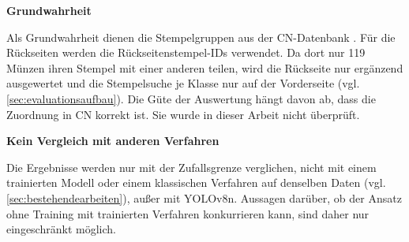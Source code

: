 \vspace{\baselineskip}

\noindent \textbf{Grundwahrheit} 

\noindent Als Grundwahrheit dienen die Stempelgruppen aus der CN-Datenbank \cite{cn-about}. Für die Rückseiten werden die Rückseitenstempel-IDs verwendet. Da dort nur 119 Münzen ihren Stempel mit einer anderen teilen, wird die Rückseite nur ergänzend ausgewertet und die Stempelsuche je Klasse nur auf der Vorderseite (vgl. \cref{sec:evaluationsaufbau}). Die Güte der Auswertung hängt davon ab, dass die Zuordnung in CN korrekt ist. Sie wurde in dieser Arbeit nicht überprüft.

\vspace{\baselineskip}

\noindent \textbf{Kein Vergleich mit anderen Verfahren} 

\noindent Die Ergebnisse werden nur mit der Zufallsgrenze verglichen, nicht mit einem trainierten Modell oder einem klassischen Verfahren auf denselben Daten (vgl. \cref{sec:bestehendearbeiten}), außer mit YOLOv8n. Aussagen darüber, ob der Ansatz ohne Training mit trainierten Verfahren konkurrieren kann, sind daher nur eingeschränkt möglich.